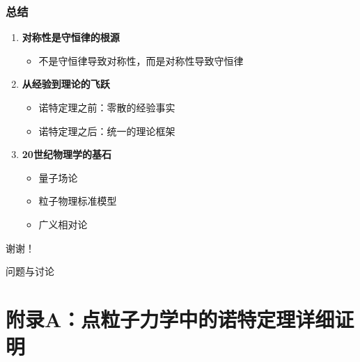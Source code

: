 \documentclass[xcolor=dvipsnames]{ctexbeamer}
\begin{document}
\begin{frame}
\frametitle{总结}
\begin{enumerate}
\item \textbf{对称性是守恒律的根源}
\begin{itemize}
\item 不是守恒律导致对称性，而是对称性导致守恒律
\end{itemize}

\pause

\item \textbf{从经验到理论的飞跃}
\begin{itemize}
\item 诺特定理之前：零散的经验事实
\item 诺特定理之后：统一的理论框架
\end{itemize}

\pause

\item \textbf{20世纪物理学的基石}
\begin{itemize}
\item 量子场论
\item 粒子物理标准模型
\item 广义相对论
\end{itemize}
\end{enumerate}
\end{frame}

\begin{frame}
\begin{center}
{\Huge 谢谢！}

\vspace{2em}

{\Large 问题与讨论}
\end{center}
\end{frame}

\appendix

\section{附录A：点粒子力学中的诺特定理详细证明}
\end{document}

